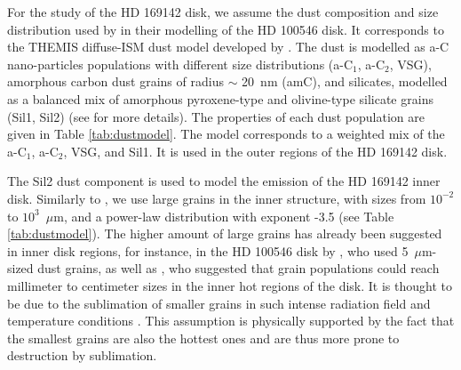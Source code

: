 \documentclass{aa}
\newcommand{\mic}{~$\mu$m\xspace}
\begin{document}
For the study of the HD 169142 disk, we assume the dust composition and size distribution used by \citet{Habart2021} in their modelling of the HD 100546 disk. It corresponds to the THEMIS diffuse-ISM dust model developed by \citet{Jones2013, Kohler2014}. The dust is modelled as a-C nano-particles populations with different size distributions (a-C$_1$, a-C$_2$, VSG), amorphous carbon dust grains of radius $\sim$ 20~nm (amC), and silicates, modelled as a balanced mix of amorphous pyroxene-type and olivine-type silicate grains (Sil1, Sil2) (see \citet{Habart2021} for more details). The properties of each dust population are given in Table \ref{tab:dustmodel}. The \citet{Habart2021} model corresponds to a weighted mix of the a-C$_1$, a-C$_2$, VSG, and Sil1. It is used in the outer regions of the HD 169142 disk.

The Sil2 dust component is used to model the emission of the HD 169142 inner disk. Similarly to \citet{Chen2018}, we use large grains in the inner structure, with sizes from $10^{-2}$ to $10^3$\mic, and a power-law distribution with exponent -3.5 (see Table \ref{tab:dustmodel}). The higher amount of large grains has already been suggested in inner disk regions, for instance, in the HD 100546 disk by \citet{Tatulli2011}, who used 5\mic -sized dust grains, as well as \citet{Miley2019}, who suggested that grain populations could reach millimeter to centimeter sizes in the inner hot regions of the disk. It is thought to be due to the sublimation of smaller grains in such intense radiation field and temperature conditions \citep{Tatulli2011}. This assumption is physically supported by the fact that the smallest grains are also the hottest ones and are thus more prone to destruction by sublimation.
\end{document}

